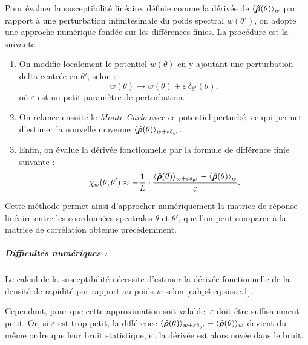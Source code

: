 Pour évaluer la susceptibilité linéaire, définie comme la dérivée de \( \langle \hat{\bm{\rho}}(\theta) \rangle_w \) par rapport à une perturbation infinitésimale du poids spectral \( w(\theta') \), on adopte une approche numérique fondée sur les différences finies. La procédure est la suivante :
\begin{enumerate}
    \item On modifie localement le potentiel \( w(\theta) \) en y ajoutant une perturbation delta centrée en \( \theta' \), selon :
    \begin{equation}
    	w(\theta) \rightarrow w(\theta) + \varepsilon\, \delta_{\theta'}(\theta),
   	\end{equation}
    où \( \varepsilon \) est un petit paramètre de perturbation.

    \item On relance ensuite le \emph{Monte Carlo} avec ce potentiel perturbé, ce qui permet d’estimer la nouvelle moyenne \( \langle \hat{\bm{\rho}}(\theta) \rangle_{w + \varepsilon \delta_{\theta'}} \).

    \item Enfin, on évalue la dérivée fonctionnelle par la formule de différence finie suivante :
    \begin{equation}\label{cahp4:eq.sus.e.1}
    	\chi_w(\theta, \theta')  \approx -\frac{1}{L} \cdot \frac{ \langle \hat{\bm{\rho}}(\theta) \rangle_{w + \varepsilon \delta_{\theta'}} -  \langle\hat{\bm{\rho}} (\theta) \rangle_w }{ \varepsilon }.
    \end{equation}
\end{enumerate}

Cette méthode permet ainsi d’approcher numériquement la matrice de réponse linéaire entre les coordonnées spectrales \( \theta \) et \( \theta' \), que l’on peut comparer à la matrice de corrélation obtenue précédemment.


\subparagraph{Difficultés numériques :}
Le calcul de la susceptibilité nécessite d’estimer la dérivée fonctionnelle de la densité de rapidité par rapport au poids \( w \) selon \eqref{cahp4:eq.sus.e.1}.

\medskip

Cependant, pour que cette approximation soit valable, \( \varepsilon \) doit être suffisamment petit. Or, si \( \varepsilon \) est trop petit, la différence  \( \langle \hat{\bm{\rho}}(\theta) \rangle_{w + \varepsilon \delta_{\theta'}} -  \langle\hat{\bm{\rho}} (\theta) \rangle_w \) devient du même ordre que leur bruit statistique, et la dérivée est alors noyée dans le bruit.

